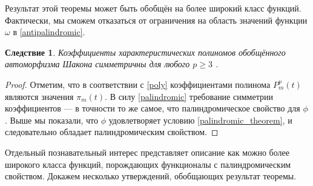 \documentclass[14pt, a4paper, russian]{report}
\newtheorem{corollary}{\indent Следствие}
\begin{document}
Результат этой теоремы может быть обобщён на более широкий класс функций. Фактически, мы сможем отказаться от ограничения на область значений функции $\omega$ в \cref{antipalindromic}.

\begin{corollary}
Коэффициенты характеристических полиномов обобщённого автоморфизма Шакона симметричны для любого $p \ge 3$ .
\end{corollary}
\begin{proof}
Отметим, что в соответствии с \cref{poly} коэффициентами полинома $P_m^p(t)$ являются значения $\pi_m(t)$. В силу \cref{palindromic} требование симметрии коэффициентов --- в точности то же самое, что палиндромическое свойство для $\phi$. Выше мы показали, что $\phi$ удовлетворяет условию \cref{palindromic_theorem}, и следовательно обладает палиндромическим свойством.
\end{proof}

Отдельный познавательный интерес представляет описание как можно более широкого класса функций, порождающих функционалы с палиндромическим свойством. Докажем несколько утверждений, обобщающих результат теоремы.
\end{document}
